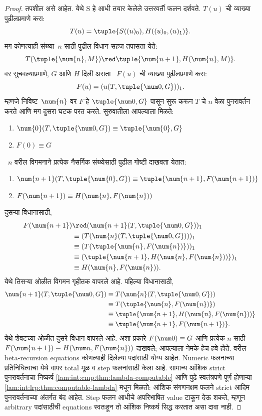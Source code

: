 \begin{proof}
तपशील असे आहेत. येथे S हे आधी तयार केलेले उत्तरवर्ती
फलन दर्शवते. $T(u)$ ची व्याख्या पुढीलप्रमाणे करा:
\[T(u) = \tuple{S((u)_0), H((u)_0,(u)_1)}.
\]
मग कोणत्याही संख्या~$n$ साठी पुढील विधान सहज तपासता येते:
\[T(\tuple{\num{n}, M}) \red \tuple{\num{n+1}, H(\num{n}, M)}.
\]
वर सुचवल्याप्रमाणे, $G$ आणि $H$ दिली असता
~$F(u)$ ची व्याख्या पुढीलप्रमाणे करा:
\[F(u) = (u(T,\tuple{\num 0, G}))_1.
\]
म्हणजे निविष्ट~$\num{n}$ वर $F$ हे
$\tuple{\num 0, G}$ पासून सुरू करून $T$ चे $n$
वेळा पुनरावर्तन करते आणि मग दुसरा घटक परत करते.
सुरुवातीला आपल्याला मिळते:
\begin{enumerate}
\item $\num{0} (T, \tuple{\num 0, G}) \equiv \tuple{\num{0}, G}$
\item $F(\num{0}) \equiv G$
\end{enumerate}
~$n$ वरील विगमनाने प्रत्येक नैसर्गिक संख्येसाठी
पुढील गोष्टी दाखवता येतात:
\begin{enumerate}
\item $\num{n+1}(T, \tuple{\num{0}, G}) \equiv \tuple{\num{n+1}, F(\num{n+1})}$
\item $F(\num{n+1}) \equiv H(\num{n}, F(\num{n}))$
\end{enumerate}
दुसऱ्या विधानासाठी,
\begin{align*}
F(\num{n+1}) & \red (\num{n+1}(T, \tuple{\num 0, G}))_1 \\
& \equiv (T(\num{n} (T, \tuple{\num 0, G})))_1 \\
& \equiv (T(\tuple{\num{n}, F(\num{n})}))_1 \\
& \equiv (\tuple{\num{n+1}, H(\num{n}, F(\num{n}))})_1 \\
& \equiv H(\num{n}, F(\num{n})).
\end{align*}
येथे तिसऱ्या ओळीत विगमन गृहीतक वापरले आहे.
पहिल्या विधानासाठी,
\begin{align*}
\num{n+1} (T, \tuple{\num 0, G}) &
\equiv T(\num{n} (T, \tuple{\num 0, G})) \\
& \equiv T( \tuple{\num{n}, F(\num{n})}) \\
& \equiv \tuple{\num{n+1}, H(\num{n}, F(\num{n}))} \\
& \equiv \tuple{\num{n+1}, F(\num{n+1})}.
\end{align*}
येथे शेवटच्या ओळीत दुसरे विधान वापरले आहे.
अशा प्रकारे $F(\num 0) \equiv G$ आणि प्रत्येक $n$
साठी $F(\num {n+1}) \equiv H(\num
n, F(\num{n}))$ दाखवले; आपल्याला नेमके हेच हवे होते.
वरील beta-recursion equations कोणत्याही दिलेल्या पदांसाठी
योग्य आहेत. Numeric फलनाच्या प्रतिनिधित्वाचा येथे वापर
total मूळ व step फलनांसाठी केला आहे. सामान्य आंशिक
strict पुनरावर्तनाचा निष्कर्ष \ref{lam:int:cmp:thm:lambda-computable}
आणि पुढे स्वतंत्रपणे पूर्ण होणाऱ्या
\ref{lam:int:lrp:thm:computable-lambda} मधून मिळतो: आंशिक
संगणनक्षम फलने strict आदिम पुनरावर्तनाच्या अंतर्गत बंद आहेत.
Step फलन आधीचे अपरिभाषित value टाकून देऊ शकते,
म्हणून arbitrary पदांसाठीची equations स्वतःहून तो
आंशिक निष्कर्ष सिद्ध करतात असा दावा नाही.
\end{proof}











